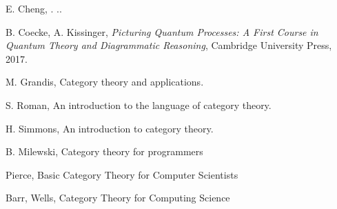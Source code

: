 \documentclass[10pt, article, one side]{memoir}
\begin{document}
    
    

    \begin{thebibliography}{00}

        E.
        Cheng, .
        ..

        B.
        Coecke, A.
        Kissinger,
        \emph{Picturing Quantum Processes: A First Course in Quantum Theory and Diagrammatic Reasoning},
        Cambridge University Press, 2017.

        M.
        Grandis, Category theory and applications.

        S.
        Roman, An introduction to the language of category theory.

        H.
        Simmons, An introduction to category theory.

        B.
        Milewski, Category theory for programmers

         Pierce, Basic Category Theory for Computer Scientists

         Barr, Wells, Category Theory for Computing Science

    \end{thebibliography}
\end{document}
